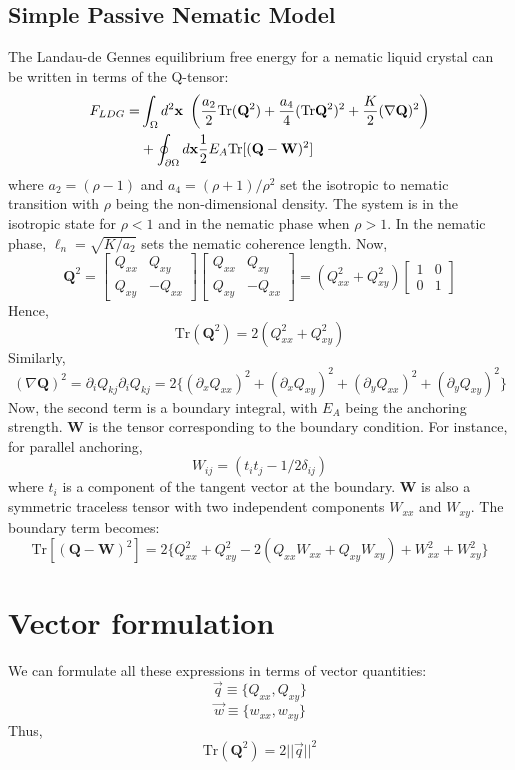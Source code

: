 \documentclass{article}
\begin{document}
\subsection{Simple Passive Nematic Model}
The Landau-de Gennes equilibrium free energy for a nematic liquid crystal can be written in terms of the Q-tensor:
\begin{align*}
F_{LDG} = &\int_\Omega d^2{\bf x} \ \left(\frac{a_2}{2} \text{Tr}(\mathbf{Q}^2) + \frac{a_4}{4} (\text{Tr} \mathbf{Q}^2)^2 + \frac{K}{2}(\nabla\mathbf{Q})^2 \right) \\
&+ \oint_{\partial\Omega} d{\bf x} \frac{1}{2}E_A \text{Tr}[(\mathbf{Q}-\mathbf{W})^2]
\end{align*}
where $a_2 = (\rho-1)$ and $a_4 = (\rho+1)/\rho^2$ 
set the isotropic to nematic transition with $\rho$ being the non-dimensional density. The system is in the isotropic state for $\rho<1$ and in the nematic phase when $\rho>1$. In the nematic phase, $\ell_n = \sqrt{K/a_2}$ sets the nematic coherence length. Now,
\[
\mathbf{Q}^2 = \begin{bmatrix}Q_{xx} & Q_{xy} \\ Q_{xy} & -Q_{xx} \end{bmatrix} \begin{bmatrix}Q_{xx} & Q_{xy} \\ Q_{xy} & -Q_{xx} \end{bmatrix} = (Q_{xx}^2+Q_{xy}^2) \begin{bmatrix} 1 & 0 \\ 0 & 1 \end{bmatrix}
\]
Hence, 
\[
\text{Tr}(\mathbf{Q}^2) = 2(Q_{xx}^2+Q_{xy}^2)
\]
Similarly,
\[
(\nabla \mathbf{Q})^2 = \partial_i Q_{kj}\partial_i Q_{kj} = 2 \{ (\partial_x Q_{xx})^2+(\partial_xQ_{xy})^2 + (\partial_y Q_{xx})^2+(\partial_y Q_{xy})^2 \}
\]
Now, the second term is a boundary integral, with $E_A$ being the anchoring strength. $\mathbf{W}$ is the tensor corresponding to the boundary condition. For instance, for parallel anchoring, 
\[
W_{ij} = (t_i t_j - 1/2 \delta_{ij})
\]
where $t_i$ is a component of the tangent vector at the boundary.
$\mathbf{W}$ is also a symmetric traceless tensor with two independent components $W_{xx}$ and $W_{xy}$.
The boundary term becomes:
\[ \text{Tr}[(\mathbf{Q}-\mathbf{W})^2] = 2\{ Q_{xx}^2 + Q_{xy}^2 - 2(Q_{xx}W_{xx} + Q_{xy}W_{xy}) + W_{xx}^2 + W_{xy}^2 \} 
\]
\section{Vector formulation}
We can formulate all these expressions in terms of vector quantities:
\[\vec{q} \equiv \{ Q_{xx}, Q_{xy}\}\]
\[\vec{w} \equiv \{ w_{xx}, w_{xy}\}\]
Thus,
\[
\text{Tr}(\mathbf{Q}^2) = 2 ||\vec{q}||^2
\]
\end{document}
